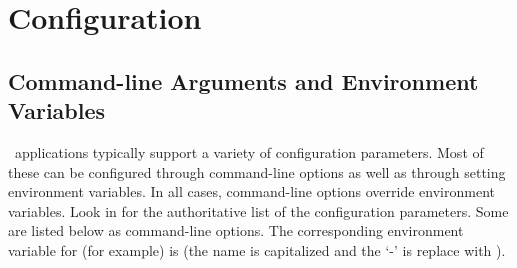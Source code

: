 \section{Configuration}

\subsection{Command-line Arguments and Environment Variables}
\label{subsect:config}
\ensemble\ applications typically support a variety of configuration
parameters.  Most of these can be configured through command-line options as
well as through setting environment variables.  In all cases, command-line
options override environment variables.  Look in  for the
authoritative list of the configuration parameters.  Some are listed below as
command-line options.  The corresponding environment variable for
 (for example) is  (the name is
capitalized and the `-' is replace with ).
